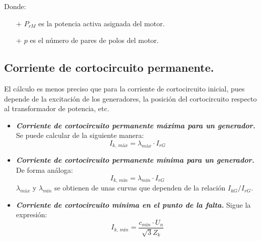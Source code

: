 \begin{itemize}
\begin{itemize}
\begin{equation}
                                \end{equation}
                                Donde:
                                \begin{itemize}
                                    \item[+] $P_\textit{rM}$ es la potencia activa asignada del motor.
                                    \item[+] $p$ es el número de pares de polos del motor.
                                \end{itemize}
                        \end{itemize}
                \end{itemize}
            
            \subsection{Corriente de cortocircuito permanente.}
                El cálculo es menos preciso que para la corriente de cortocircuito inicial, pues depende de la excitación de los generadores, la posición del cortocircuito respecto al transformador de potencia, etc. 
                
                \begin{itemize}
                    \item \textit{\textbf{Corriente de cortocircuito permanente máxima para un generador.}} Se puede calcular de la siguiente manera:
                    \begin{equation}
                        I_\textit{k, máx} = \lambda_\textit{máx}\cdot I_\textit{rG}
                    \end{equation}
                    \item \textit{\textbf{Corriente de cortocircuito permanente mínima para un generador.}} De forma análoga:
                    \begin{equation}
                        I_\textit{k, mín} = \lambda_\textit{mín}\cdot I_\textit{rG}
                    \end{equation}
                    $\lambda_\textit{máx}$ y $\lambda_\textit{mín}$ se obtienen de unas curvas que dependen de la relación $I_\textit{kG}/I_\textit{rG}$.
                    \item \textit{\textbf{Corriente de cortocircuito mínima en el punto de la falta.}} Sigue la expresión:
                    \begin{equation}
                        I_\textit{k, mín} = \dfrac{c_\textit{mín}\cdot U_\textit{n}}{\sqrt{3}Z_\textit{k}}
                    \end{equation}
                \end{itemize}

